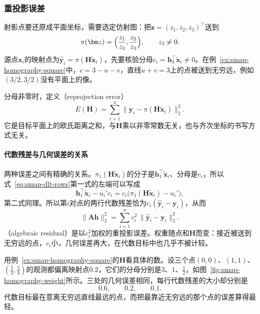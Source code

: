 \subsubsection{重投影误差}
\label{sec:smap-reprojection}

射影点要还原成平面坐标，需要选定仿射图：把$\bm z=(z_1,z_2,z_3)^\top$送到
\begin{equation}
 \pi(\bm z)=\Bigl(\frac{z_1}{z_3},\frac{z_2}{z_3}\Bigr),\qquad z_3\neq0 .
 \label{eq:smap-affine-chart}
\end{equation}
源点$\bm x_i$的映射点为$\widehat{\bm y}_i=\pi(\bm H\widetilde{\bm x}_i)$，先要核验分母$c_i=\bm h_3^\top\widetilde{\bm x}_i\neq0$。在例~\ref{ex:smap-homography-square}中，$c=3-u-v$，直线$u+v=3$上的点被送到无穷远，例如$(3/2,3/2)$没有平面上的像。

分母非零时，定义（reprojection error）
\begin{equation}
 E(\bm H)=\sum_{i=1}^n\lVert\bm y_i-\pi(\bm H\widetilde{\bm x}_i)\rVert_2^2 .
 \label{eq:smap-reprojection}
\end{equation}
它是目标平面上的欧氏距离之和，与$\bm H$乘以非零常数无关，也与齐次坐标的书写方式无关。

\paragraph{代数残差与几何误差的关系}

两种误差之间有精确的关系。$\pi_1(\bm H\widetilde{\bm x}_i)$的分子是$\bm h_1^\top\widetilde{\bm x}_i$、分母是$c_i$，所以式~\eqref{eq:smap-dlt-rows}第一式的左端可以写成
\[
 \bm h_1^\top\widetilde{\bm x}_i-u_i'c_i=c_i\bigl(\pi_1(\bm H\widetilde{\bm x}_i)-u_i'\bigr) ,
\]
第二式同理。所以第$i$对点的两行代数残差恰为$c_i(\widehat{\bm y}_i-\bm y_i)$，从而
\begin{equation}
 \lVert\bm A\bm h\rVert_2^2=\sum_{i=1}^nc_i^2\,\lVert\widehat{\bm y}_i-\bm y_i\rVert_2^2 .
 \label{eq:smap-algebraic-geometric}
\end{equation}
（algebraic residual）是以$c_i^2$加权的重投影误差。权重随点和$\bm H$而变：接近被送到无穷远的点，$c_i$小，几何误差再大，在代数目标中也几乎不被计较。

用例~\ref{ex:smap-homography-square}的$\bm H$看具体的数。设三个点$(0,0)$、$(1,1)$、$(\frac54,\frac54)$的观测都偏离映射点$0.2$，它们的分母分别是$3$、$1$、$\frac12$，如图~\ref{fig:smap-homography-weight}所示。三处的几何误差相同，每行代数残差的大小却分别是
\[
 0.6,\qquad0.2,\qquad0.1 .
\]
代数目标最在意离无穷远直线最远的点，而把最靠近无穷远的那个点的误差算得最轻。

